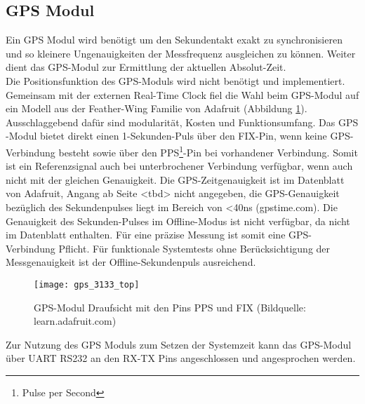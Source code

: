 \subsection{GPS Modul}
\label{cap:gps_modul}
	Ein GPS Modul wird benötigt um den Sekundentakt exakt zu synchronisieren und so kleinere Ungenauigkeiten der Messfrequenz ausgleichen zu können. Weiter dient das GPS-Modul zur Ermittlung der aktuellen Absolut-Zeit.\\
	Die Positionsfunktion des GPS-Moduls wird nicht benötigt und implementiert. Gemeinsam mit der externen Real-Time Clock fiel die Wahl beim GPS-Modul auf ein Modell aus der Feather-Wing Familie von Adafruit (Abbildung \ref{fig:GPS3133}).
    Ausschlaggebend dafür sind modularität, Kosten und Funktionsumfang. Das GPS -Modul bietet direkt einen 1-Sekunden-Puls über den FIX-Pin, wenn keine GPS-Verbindung besteht sowie über den PPS\footnote{Pulse per Second}-Pin bei vorhandener Verbindung. Somit ist ein Referenzsignal auch bei unterbrochener Verbindung verfügbar, wenn auch nicht mit der gleichen Genauigkeit. Die GPS-Zeitgenauigkeit ist im Datenblatt von Adafruit, Angang ab Seite <tbd> nicht angegeben, die GPS-Genauigkeit bezüglich des Sekundenpulses liegt im Bereich von <40ns (gpstime.com). Die Genauigkeit des Sekunden-Pulses im Offline-Modus ist nicht verfügbar, da nicht im Datenblatt enthalten. Für eine präzise Messung ist somit eine GPS-Verbindung Pflicht. Für funktionale Systemtests ohne Berücksichtigung der Messgenauigkeit ist der Offline-Sekundenpuls ausreichend.
		\begin{figure}[H]
        	\centering
        	\texttt{[image: gps\_3133\_top]}
        	\caption{GPS-Modul Draufsicht mit den Pins PPS und FIX (Bildquelle: learn.adafruit.com)}
        	\label{fig:GPS3133}
    	\end{figure}
	\noindent Zur Nutzung des GPS Moduls zum Setzen der Systemzeit kann das GPS-Modul über UART RS232 an den RX-TX Pins angeschlossen und angesprochen werden.
%
%	
